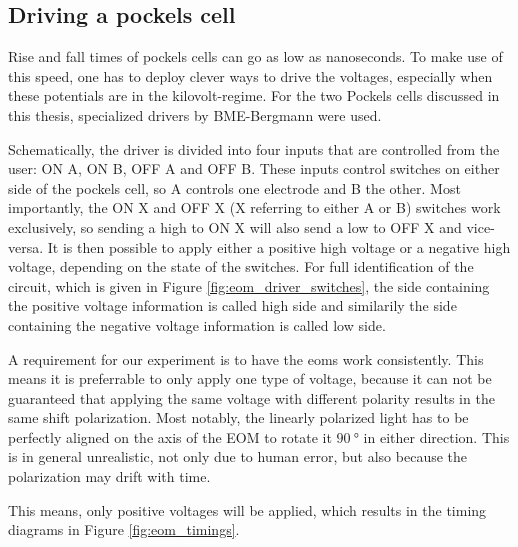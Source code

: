 \subsection{Driving a pockels cell}

Rise and fall times of pockels cells can go as low as nanoseconds. To make use of this speed, one has to deploy clever ways to drive the voltages, especially when these potentials are in the kilovolt-regime. For the two Pockels cells discussed in this thesis, specialized drivers by BME-Bergmann were used.

Schematically, the driver is divided into four inputs that are controlled from the user: ON A, ON B, OFF A and OFF B. These inputs control switches on either side of the pockels cell, so A controls one electrode and B the other. Most importantly, the ON X and OFF X (X referring to either A or B) switches work exclusively, so sending a high to ON X will also send a low to OFF X and vice-versa. It is then possible to apply either a positive high voltage or a negative high voltage, depending on the state of the switches. For full identification of the circuit, which is given in Figure \ref{fig:eom_driver_switches}, the side containing the positive voltage information is called high side and similarily the side containing the negative voltage information is called low side.

A requirement for our experiment is to have the \acp{eom} work consistently. This means it is preferrable to only apply one type of voltage, because it can not be guaranteed that applying the same voltage with different polarity results in the same shift polarization. Most notably, the linearly polarized light has to be perfectly aligned on the axis of the EOM to rotate it $\SI{90}{\degree}$ in either direction. This is in general unrealistic, not only due to human error, but also because the polarization may drift with time.

This means, only positive voltages will be applied, which results in the timing diagrams in Figure \ref{fig:eom_timings}.

\begin{figure}[t]
\end{figure}

